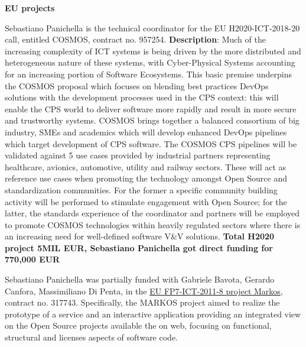 \documentclass[12pt]{article}
\newcommand{\ins}[1]{\textcolor{blue}{\uline{#1}}} %
\newcommand{\ins}[1]{#1} %
\newcommand\on[1]{\nbc{ON}{#1}{red}} %
\begin{document}
\textbf{EU projects}
\begin{innerlist}
\item Sebastiano Panichella is the technical coordinator for the EU H2020-ICT-2018-20 call, entitled COSMOS, contract no. 957254. \textbf{Description}: Much of the increasing complexity of ICT systems is being driven by the more distributed and heterogeneous nature of these systems, with Cyber-Physical Systems accounting for an increasing portion of Software Ecosystems. This basic premise underpins the COSMOS proposal which focuses on blending best practices DevOps solutions with the development processes used in the CPS context: this will enable the CPS world to deliver software more rapidly and result in more secure and trustworthy systems. COSMOS brings together a balanced consortium of big industry, SMEs and academics which will develop enhanced DevOps pipelines which target development of CPS software.
The COSMOS CPS pipelines will be validated against 5 use cases provided by industrial partners representing healthcare, avionics, automotive, utility and railway sectors. These will act as reference use cases when promoting the technology amongst Open Source and standardization communities. For the former a specific community building activity will be performed to stimulate engagement with Open Source; for the latter, the standards experience of the coordinator and partners will be employed to promote COSMOS technologies within heavily regulated sectors where there is an increasing need for well-defined software V\&V solutions. 
\textbf{Total H2020 project 5MIL EUR, Sebastiano Panichella got direct funding for 770,000 EUR} 
   \item Sebastiano Panichella was 
    partially funded with Gabriele Bavota, Gerardo Canfora, Massimiliano Di Penta, in the \href{��http://www.markosproject.eu/��}
                   {EU FP7-ICT-2011-8 project Markos}, contract no. 317743. Specifically, the MARKOS project aimed to realize the prototype of a service and an interactive application providing an integrated view on the Open Source projects available the on web, focusing on functional, structural and licenses aspects of software code. 
\end{innerlist}
\end{document}
